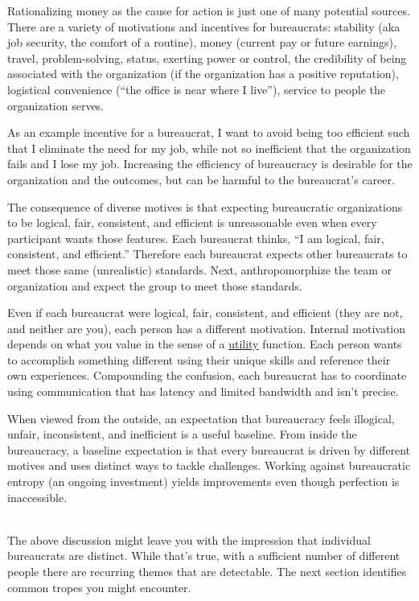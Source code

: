 Rationalizing money as the cause for action is just one of many potential sources.
There are a variety of motivations and incentives for bureaucrats: 
stability (aka job security, the comfort of a routine),
money (current pay or future earnings), 
travel, 
problem-solving, 
status, 
exerting power or control, 
the credibility of being associated with the organization (if the organization has a positive reputation), 
logistical convenience (``the office is near where I live''), 
service to people the organization serves.


As an example incentive for a bureaucrat, I want to avoid being too efficient such that I eliminate the need for my job, 
while not so inefficient that the organization fails and I lose my job. Increasing the efficiency of bureaucracy is desirable for the organization and the outcomes, but can be harmful to the bureaucrat's career.


The consequence of diverse motives is that expecting bureaucratic organizations to be logical, fair, consistent, and efficient is unreasonable even when every participant wants those features. Each bureaucrat thinks, ``I am logical, fair, consistent, and efficient.'' Therefore each bureaucrat expects other bureaucrats to meet those same (unrealistic) standards. Next, anthropomorphize the team or organization and expect the group to meet those standards. 

Even if each bureaucrat were logical, fair, consistent, and efficient (they are not, and neither are you), each person has a different motivation. Internal motivation depends on what you value in the sense of a
\href{https://en.wikipedia.org/wiki/Utility}{utility}\iftoggle{WPinmargin}{\marginpar{$>$Wikipedia: Utility}}{}
function.  Each person wants to accomplish something different using their unique skills and reference their own experiences. Compounding the confusion, each bureaucrat has to coordinate using communication that has latency and limited bandwidth and isn't precise.

When viewed from the outside, an expectation that bureaucracy feels illogical, unfair, inconsistent, and inefficient is a useful baseline. From inside the bureaucracy, a baseline expectation is that every bureaucrat is driven by different motives and uses distinct ways to tackle challenges. Working against bureaucratic entropy (an ongoing investment) yields improvements even though perfection is inaccessible.


\ \\


The above discussion might leave you with the impression that individual bureaucrats are distinct. While that's true, with a sufficient number of different people there are recurring themes that are detectable. The next section identifies common tropes you might encounter.